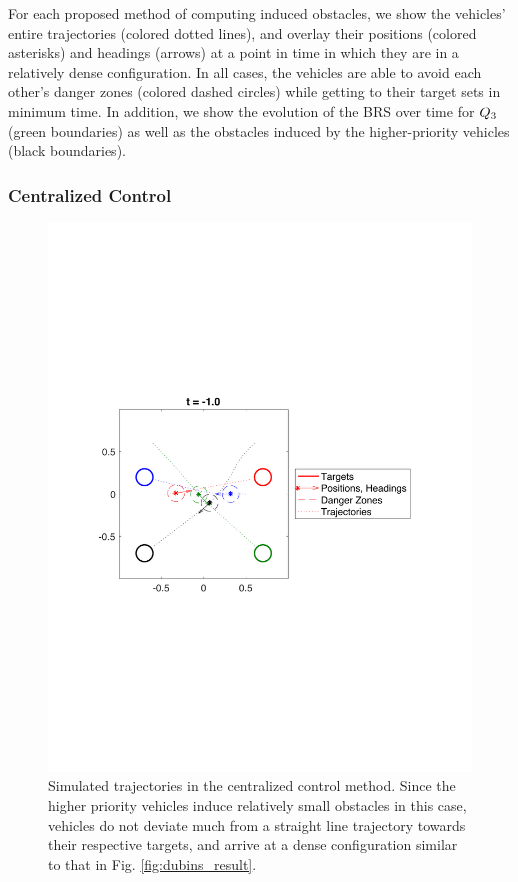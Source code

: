 For each proposed method of computing induced obstacles, we show the vehicles' entire trajectories (colored dotted lines), and overlay their positions (colored asterisks) and headings (arrows) at a point in time in which they are in a relatively dense configuration. In all cases, the vehicles are able to avoid each other's danger zones (colored dashed circles) while getting to their target sets in minimum time. In addition, we show the evolution of the BRS over time for $Q_3$ (green boundaries) as well as the obstacles induced by the higher-priority vehicles (black boundaries).

\subsubsection{Centralized Control}
\begin{figure}
  \centering
  \includegraphics[width=\columnwidth]{"fig/cc_traj"}
  \caption{Simulated trajectories in the centralized control method. Since the higher priority vehicles induce relatively small obstacles in this case, vehicles do not deviate much from a straight line trajectory towards their respective targets, and arrive at a dense configuration similar to that in Fig. \ref{fig:dubins_result}.}
  \label{fig:cc_traj}
\end{figure}

